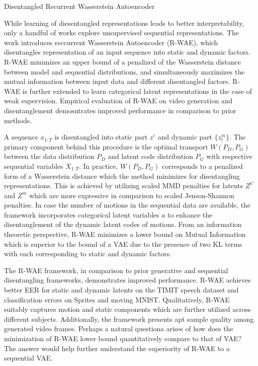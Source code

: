 \documentclass[12pt,letterpaper]{article}
\begin{document}
\begin{center}
  \large{Disentangled Recurrent Wasserstein Autoencoder}
\end{center}

While learning of diesentangled representations leads to better interpretability, only a handful of works explore unsupervised sequential representations. The work introduces reccurrent Wasserstein Autoencoder (R-WAE), which disentangles representation of an input sequence into static and dynamic factors. R-WAE minimizes an upper bound of a penalized of the Wasserstein distance between model and sequential distributions, and simultaneously maximizes the mutual information between input data and different disentangled factors. R-WAE is further extended to learn categorical latent representations in the case of weak supervision. Empirical evaluation of R-WAE on video generation and disentanglement demosntrates improved performance in comparison to prior methods.

A sequence $x_{1:T}$ is disentangled into static part $z^{c}$ and dynamic part $\{z_{t}^{m}\}$. The primary component behind this procedure is the optimal transport $W(P_{D}, P_{G})$ between the data distribution $P_{D}$ and latent code distribution $P_{G}$ with respective sequential variables $X_{1:T}$. In practice, $W(P_{D},P_{G})$ corresponds to a penalized form of a Wasserstein distance which the method minimizes for disentangling representations. This is achieved by utilizing scaled MMD penalties for latents $Z^{C}$ and $Z^{m}$ which are more expressive in comparison to scaled Jenson-Shannon penalties. In case the number of motions in the sequential data are available, the framework incorporates categorical latent variables $a$ to enhance the disentanglement of the dynamic latent codes of motions. From an information theoretic perspective, R-WAE minimizes a lower bound on Mutual Information which is superior to the bound of a VAE due to the presence of two KL terms with each corresponding to static and dynamic factors.

The R-WAE framework, in comparison to prior generative and sequential disentangling frameworks, demonstrates improved performance. R-WAE achieves better EER for static and dynamic latents on the TIMIT speech dataset and classification errors on Sprites and moving MNIST. Qualitatively, R-WAE suitably captures motion and static components which are further utilized across different subjects. Additionally, the framework presents apt sample quality among generated video frames. Perhaps a natural questiona arises of how does the minimization of R-WAE lower bound quantitatively compare to that of VAE? The answer would help further understand the superiority of R-WAE to a sequential VAE. 
\end{document}
